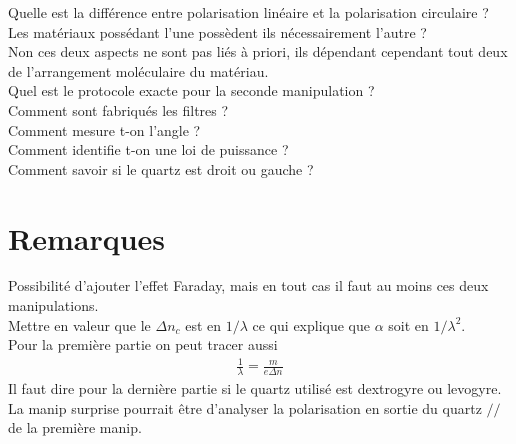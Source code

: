 \documentclass[12pt,prb,aps,epsf]{report}
\begin{document}
Quelle est la différence entre polarisation linéaire et la polarisation circulaire ?\\

Les matériaux possédant l'une possèdent ils nécessairement l'autre ?\\
Non ces deux aspects ne sont pas liés à priori, ils dépendant cependant tout deux de l'arrangement moléculaire du matériau.\\

Quel est le protocole exacte pour la seconde manipulation ?\\

Comment sont fabriqués les filtres ?\\

Comment mesure t-on l'angle ?\\

Comment identifie t-on une loi de puissance ?\\

Comment savoir si le quartz est droit ou gauche ?

\section*{Remarques}
Possibilité d'ajouter l'effet Faraday, mais en tout cas il faut au moins ces deux manipulations.\\
Mettre en valeur que le $\Delta n_c$ est en $1/\lambda$ ce qui explique que $\alpha$ soit en $1/\lambda^2$.\\
Pour la première partie on peut tracer aussi 
\begin{eqnarray}
\frac{1}{\lambda} = \frac{m}{e\Delta n}
\end{eqnarray}
Il faut dire pour la dernière partie si le quartz utilisé est dextrogyre ou levogyre.\\
La manip surprise pourrait être d'analyser la polarisation en sortie du quartz $//$ de la première manip.\\
\end{document}
